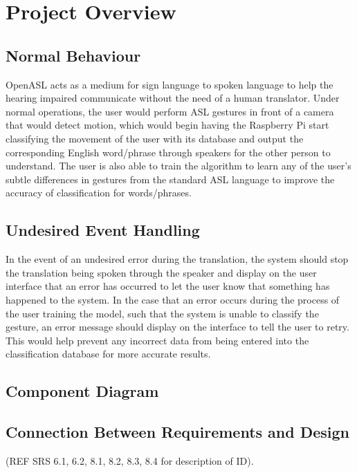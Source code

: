 \documentclass[12pt, titlepage]{article}
\begin{document}
\section{Project Overview}

\subsection{Normal Behaviour}
OpenASL acts as a medium for sign language to spoken language to help the hearing impaired communicate without the need of a human translator. 
Under normal operations, the user would perform ASL gestures in front of a camera that would detect motion, which would begin having the Raspberry Pi 
start classifying the movement of the user with its database and output the corresponding English word/phrase through speakers for the other person to 
understand. The user is also able to train the algorithm to learn any of the user’s subtle differences in gestures from the standard ASL language to 
improve the accuracy of classification for words/phrases.

\subsection{Undesired Event Handling}
In the event of an undesired error during the translation, the system should stop the translation being spoken through the speaker and display on the 
user interface that an error has occurred to let the user know that something has happened to the system. In the case that an error occurs during the 
process of the user training the model, such that the system is unable to classify the gesture, an error message should display on the interface to 
tell the user to retry. This would help prevent any incorrect data from being entered into the classification database for more accurate results.

\subsection{Component Diagram}

\subsection{Connection Between Requirements and Design} \label{SecConnection}
(REF SRS 6.1, 6.2, 8.1, 8.2, 8.3, 8.4 for description of ID).
\end{document}
